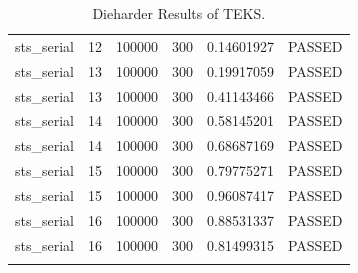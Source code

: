 \begin{longtable}{cccccc}
sts\_serial & 12 & 100000 & 300 & 0.14601927 & PASSED \\
sts\_serial & 13 & 100000 & 300 & 0.19917059 & PASSED \\
sts\_serial & 13 & 100000 & 300 & 0.41143466 & PASSED \\
sts\_serial & 14 & 100000 & 300 & 0.58145201 & PASSED \\
sts\_serial & 14 & 100000 & 300 & 0.68687169 & PASSED \\
sts\_serial & 15 & 100000 & 300 & 0.79775271 & PASSED \\
sts\_serial & 15 & 100000 & 300 & 0.96087417 & PASSED \\
sts\_serial & 16 & 100000 & 300 & 0.88531337 & PASSED \\
sts\_serial & 16 & 100000 & 300 & 0.81499315 & PASSED \\
\bottomrule
\caption{Dieharder Results of TEKS.}
\label{table}
\end{longtable}

